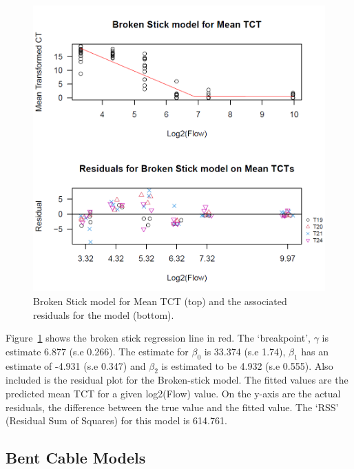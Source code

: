\begin{figure}[H]
\includegraphics[scale=0.7]{Chapter4Images/meanbrokenstick.png}
\caption{Broken Stick model for Mean TCT (top) and the associated residuals for the model (bottom).}
\label{fig:brokenstickmean}
\end{figure}



Figure~\ref{fig:brokenstickmean} shows the broken stick regression line in red. The `breakpoint', $\gamma$ is estimate 6.877 (s.e 0.266). The estimate for $\beta_{0}$ is 33.374 (s.e 1.74), $\beta_{1}$ has an estimate of -4.931 (s.e 0.347) and $\beta_{2}$ is estimated to be 4.932 (s.e 0.555). Also included is the residual plot for the Broken-stick model. The fitted values are the predicted mean TCT for a given log2(Flow) value. On the y-axis are the actual residuals, the difference between the true value and the fitted value. The `RSS' (Residual Sum of Squares) for this model is 614.761.



\subsection{Bent Cable Models}


